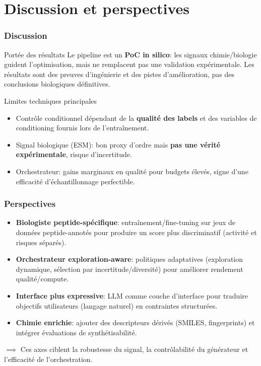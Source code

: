 \section{Discussion et perspectives}

\begin{frame}
    \frametitle{Discussion}
    \begin{block}{Portée des résultats}
        \footnotesize
        Le pipeline est un \textbf{PoC in silico}: les signaux chimie/biologie guident l'optimisation, mais ne remplacent pas une validation expérimentale. Les résultats sont des preuves d'ingénierie et des pistes d'amélioration, pas des conclusions biologiques définitives.
    \end{block}

    \begin{block}{Limites techniques principales}
        \footnotesize
        \begin{itemize}
            \item Contrôle conditionnel dépendant de la \textbf{qualité des labels} et des variables de conditioning fournis lors de l'entraînement.
            \item Signal biologique (ESM): bon proxy d'ordre mais \textbf{pas une vérité expérimentale}, risque d'incertitude.
            \item Orchestrateur: gains marginaux en qualité pour budgets élevés, signe d'une efficacité d'échantillonnage perfectible.
        \end{itemize}
    \end{block}
\end{frame}

\begin{frame}
    \frametitle{Perspectives}
    \begin{itemize}
        \item \textbf{Biologiste peptide-spécifique}: entraînement/fine-tuning sur jeux de données peptide-annotés pour produire un score plus discriminatif (activité et risques séparés).
        \item \textbf{Orchestrateur exploration-aware}: politiques adaptatives (exploration dynamique, sélection par incertitude/diversité) pour améliorer rendement qualité/compute.
        \item \textbf{Interface plus expressive}: LLM comme couche d'interface pour traduire objectifs utilisateurs (langage naturel) en contraintes structurées.
        \item \textbf{Chimie enrichie}: ajouter des descripteurs dérivés (SMILES, fingerprints) et intégrer évaluations de synthétisabilité.
    \end{itemize}
    \vspace{0.5em}
    \begin{center}
        \footnotesize $\implies$ Ces axes ciblent la robustesse du signal, la contrôlabilité du générateur et l'efficacité de l'orchestration.
    \end{center}
\end{frame}